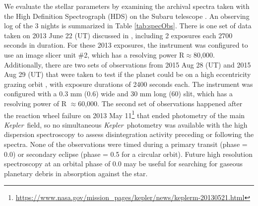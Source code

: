 \documentclass[preprint,trackchanges]{aastex61}
\newcommand{\kepler}{{\it Kepler}}
\begin{document}
We evaluate the stellar parameters by examining the archival spectra taken with the High Definition Spectrograph (HDS) on the Subaru telescope \citep{noguchi2002hds}.
An observing log of the 3 nights is summarized in Table \ref{tab:specObs}.
There is one set of data taken on 2013 June 22 (UT) discussed in \citet{kawahara2013starspots}, including 2 exposures each 2700 seconds in duration.
For these 2013 exposures, the instrument was configured to use an image slicer unit \#2, which has a resolving power R$\approx$80,000.
Additionally, there are two sets of observations from 2015 Aug 28 (UT) and 2015 Aug 29 (UT) that were taken to test if the planet could be on a high eccentricity grazing orbit \citep{masuda2018rvKIC1255}, with exposure durations of 2400 seconds each.
The instrument was configured with a 0.3 mm (0.6\arcsec) wide and 30 mm long (60\arcsec) slit, which has a resolving power of R $\approx$60,000.
The second set of observations happened after the reaction wheel failure on 2013 May 11\footnote{\url{https://www.nasa.gov/mission_pages/kepler/news/keplerm-20130521.html}} that ended photometry of the main \kepler\ field, so no simultaneous \kepler\ photometry was available with the high dispersion spectroscopy to assess disintegration activity preceding or following the spectra.
None of the observations were timed during a primary transit (phase = 0.0) or secondary eclipse (phase = 0.5 for a circular orbit).
Future high resolution spectroscopy at an orbital phase of 0.0 may be useful for searching for gaseous planetary debris in absorption against the star.
\end{document}
